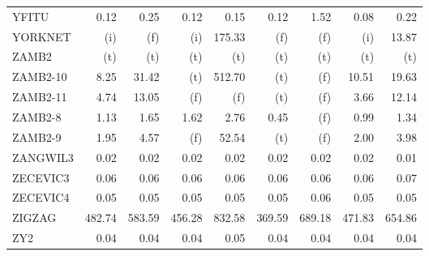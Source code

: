 \documentclass[11pt,twoside]{article}
\begin{document}
{\begin{longtable}[c]{|l|r|r|r|r|r|r|r|r|}
YFITU & 0.12 & 0.25 & 0.12 & 0.15 & 0.12 & 1.52 & 0.08 & 0.22 \\
YORKNET & (i) & (f) & (i) & 175.33 & (f) & (f) & (i) & 13.87 \\
ZAMB2 & (t) & (t) & (t) & (t) & (t) & (t) & (t) & (t) \\
ZAMB2-10 & 8.25 & 31.42 & (t) & 512.70 & (t) & (f) & 10.51 & 19.63 \\
ZAMB2-11 & 4.74 & 13.05 & (f) & (f) & (t) & (f) & 3.66 & 12.14 \\
ZAMB2-8 & 1.13 & 1.65 & 1.62 & 2.76 & 0.45 & (f) & 0.99 & 1.34 \\
ZAMB2-9 & 1.95 & 4.57 & (f) & 52.54 & (t) & (f) & 2.00 & 3.98 \\
ZANGWIL3 & 0.02 & 0.02 & 0.02 & 0.02 & 0.02 & 0.02 & 0.02 & 0.01 \\
ZECEVIC3 & 0.06 & 0.06 & 0.06 & 0.06 & 0.06 & 0.06 & 0.06 & 0.07 \\
ZECEVIC4 & 0.05 & 0.05 & 0.05 & 0.05 & 0.05 & 0.06 & 0.05 & 0.05 \\
ZIGZAG & 482.74 & 583.59 & 456.28 & 832.58 & 369.59 & 689.18 & 471.83 & 654.86 \\
ZY2 & 0.04 & 0.04 & 0.04 & 0.05 & 0.04 & 0.04 & 0.04 & 0.04 \\
\end{longtable}
}

\newpage
\end{document}
